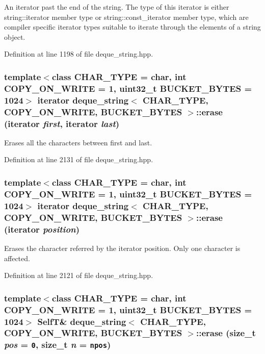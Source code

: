 An iterator past the end of the string. The type of this iterator is either string::iterator member type or string::const\_\-iterator member type, which are compiler specific iterator types suitable to iterate through the elements of a string object. 

Definition at line 1198 of file deque\_\-string.hpp.\hypertarget{classdeque__string_9433d1f64823bcc7f8bced8ab357bf51}{
\subsubsection[{erase}]{\setlength{\rightskip}{0pt plus 5cm}template$<$class CHAR\_\-TYPE  = char, int COPY\_\-ON\_\-WRITE = 1, uint32\_\-t BUCKET\_\-BYTES = 1024$>$ iterator {\bf deque\_\-string}$<$ CHAR\_\-TYPE, COPY\_\-ON\_\-WRITE, BUCKET\_\-BYTES $>$::erase (iterator {\em first}, \/  iterator {\em last})}}
\label{classdeque__string_9433d1f64823bcc7f8bced8ab357bf51}


Erases all the characters between first and last. 

Definition at line 2131 of file deque\_\-string.hpp.\hypertarget{classdeque__string_64f3c87f7723580db6d3faa52d61cdbc}{
\subsubsection[{erase}]{\setlength{\rightskip}{0pt plus 5cm}template$<$class CHAR\_\-TYPE  = char, int COPY\_\-ON\_\-WRITE = 1, uint32\_\-t BUCKET\_\-BYTES = 1024$>$ iterator {\bf deque\_\-string}$<$ CHAR\_\-TYPE, COPY\_\-ON\_\-WRITE, BUCKET\_\-BYTES $>$::erase (iterator {\em position})}}
\label{classdeque__string_64f3c87f7723580db6d3faa52d61cdbc}


Erases the character referred by the iterator position. Only one character is affected. 

Definition at line 2121 of file deque\_\-string.hpp.\hypertarget{classdeque__string_2c63c675c2fad7c5c3dd2e602e910d95}{
\subsubsection[{erase}]{\setlength{\rightskip}{0pt plus 5cm}template$<$class CHAR\_\-TYPE  = char, int COPY\_\-ON\_\-WRITE = 1, uint32\_\-t BUCKET\_\-BYTES = 1024$>$ {\bf SelfT}\& {\bf deque\_\-string}$<$ CHAR\_\-TYPE, COPY\_\-ON\_\-WRITE, BUCKET\_\-BYTES $>$::erase (size\_\-t {\em pos} = {\tt 0}, \/  size\_\-t {\em n} = {\tt {\bf npos}})}}
\label{classdeque__string_2c63c675c2fad7c5c3dd2e602e910d95}


